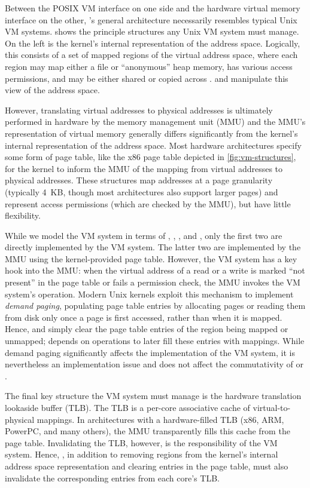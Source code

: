 Between the POSIX VM interface on one side and the hardware virtual
memory interface on the other, \vm's general architecture necessarily
resembles typical Unix VM systems.   shows the
principle structures any Unix VM system must manage.  On the left is
the kernel's internal representation of the address space.  Logically,
this consists of a set of mapped regions of the virtual address space,
where each region may map either a file or ``anonymous'' heap
memory, has various access permissions, and may be either shared or
copied across .   and 
manipulate this view of the address space.

However, translating virtual addresses to physical addresses is
ultimately performed in hardware by the memory
management unit (MMU) and the MMU's representation of virtual memory
generally differs significantly from the kernel's internal
representation of the address space.  Most hardware architectures
specify some form of page table, like the x86 page table depicted in
\cref{fig:vm-structures}, for the kernel to inform the MMU of the
mapping from virtual addresses to physical addresses.  These
structures map addresses at a page granularity (typically 4~KB, though
most architectures also support larger pages) and represent access
permissions (which are checked by the MMU), but have little
flexibility.

While we model the VM system in terms of , ,
, and , only the first two are directly
implemented by the VM system.  The latter two are implemented by the
MMU using the kernel-provided page table.  However, the VM system has
a key hook into the MMU: when the virtual address of a read or a write
is marked ``not present'' in the page table or fails a permission
check, the MMU invokes the VM system's  operation.
Modern Unix kernels exploit this mechanism to implement \emph{demand
  paging}, populating page table entries by allocating pages or
reading them from disk only once a page is first accessed, rather than
when it is mapped.
%
Hence,  and  simply clear the page table
entries of the region being mapped or unmapped;  depends on
 operations to later fill these entries with mappings.
%
While demand paging significantly affects the implementation of the VM
system, it is nevertheless an implementation issue and does not affect
the commutativity of  or .

The final key structure the VM system must manage is the hardware
translation lookaside buffer (TLB).  The TLB is a per-core associative
cache of virtual-to-physical mappings.  In architectures with a
hardware-filled TLB (x86, ARM, PowerPC, and many others), the MMU
transparently fills this cache from the page table.  Invalidating the
TLB, however, is the responsibility of the VM system.  Hence,
, in addition to removing regions from the kernel's
internal address space representation and clearing entries in the page
table, must also invalidate the corresponding entries from each core's
TLB.


